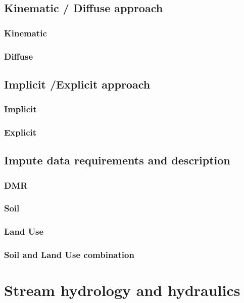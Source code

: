  

    \subsection{Kinematic / Diffuse approach}

        \subsubsection{Kinematic}
        \subsubsection{Diffuse}

    \subsection{Implicit /Explicit approach}

        \subsubsection{Implicit}
        \subsubsection{Explicit}

    \subsection{Impute data requirements and description}

        \subsubsection{DMR}
        \subsubsection{Soil}
        \subsubsection{Land Use}
        \subsubsection{Soil and Land Use  combination}

\section{Stream hydrology and hydraulics}

